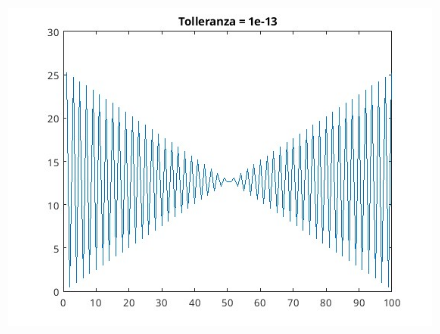 \documentclass[10pt,a4paper]{article}
\begin{document}
\begin{figure}
  \centering
  \includegraphics[width=1.2\textwidth]{../figure/15/tol1e-13.jpg}    
\end{figure}
\pagebreak
\section{}

\section{}
\section{}
\section{}
\end{document}
